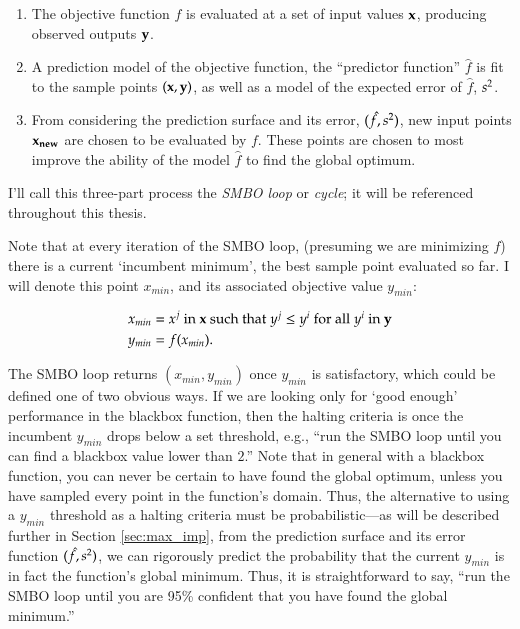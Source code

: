 \begin{minipage}{\textwidth}
\begin{framed}

\begin{enumerate} 
\item The objective function $f$ is evaluated at a set of input values $\mathbf{x}$, producing observed outputs $\mathbf{y}$.
\item A prediction model of the objective function, the ``predictor function'' $\hat{f}$ is fit to the sample points $(\mathbf{x},\mathbf{y})$, as well as a model of the expected error of $\hat{f}$, $s^2$.
\item From considering the prediction surface and its error, $(\hat{f},s^2)$, new input points $\mathbf{x_{new}}$ are chosen to be evaluated by $f$. These points are chosen to most improve the ability of the model $\hat{f}$ to find the global optimum.\end{enumerate}
\end{framed}

\label{fig:smbo_loop}
\end{minipage}
I'll call this three-part process the \emph{SMBO loop} or \emph{cycle}; it will be referenced throughout this thesis. 

Note that at every iteration of the SMBO loop, (presuming we are minimizing $f$) there is a current `incumbent minimum', the best sample point evaluated so far. I will denote this point $x_{min}$, and its associated objective value $y_{min}$:

\begin{align} \label{x_min}
x_{min} &= x^j \mbox{ in $\mathbf{x}$ such that $y^j \leq y^i$ for all $y^i$ in $\mathbf{y}$}\\
y_{min} &= f(x_{min}).
\end{align}

The SMBO loop returns $(x_{min},y_{min})$ once $y_{min}$ is satisfactory, which could be defined one of two obvious ways. If we are looking only for `good enough' performance in the blackbox function, then the halting criteria is once the incumbent $y_{min}$ drops below a set threshold, e.g., ``run the SMBO loop until you can find a blackbox value lower than $2$.'' Note that in general with a blackbox function, you can never be certain to have found the global optimum, unless you have sampled every point in the function's domain. Thus, the alternative to using a $y_{min}$ threshold as a halting criteria must be probabilistic---as will be described further in Section \ref{sec:max_imp}, from the prediction surface and its error function $(\hat{f},s^2)$, we can rigorously predict the probability that the current $y_{min}$ is in fact the function's global minimum. Thus, it is straightforward to say, ``run the SMBO loop until you are 95\% confident that you have found the global minimum.''

